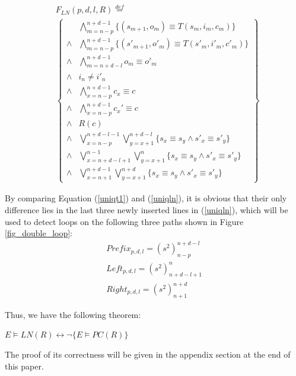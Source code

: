 \documentclass[journal]{IEEEtran}
\begin{document}
\begin{equation}\label{uniqln}
\begin{split}
&F_{LN}(p,d,l,R)\stackrel{def}{=}\\
&\left\{
\begin{array}{cc}
&\bigwedge_{m=n-p}^{n+d-1}
\{
(s_{m+1},o_m)\equiv T(s_m,i_m,c_m)
\}
\\
\wedge&\bigwedge_{m=n-p}^{n+d-1}
\{
(s'_{m+1},o'_m)\equiv T(s'_m,i'_m,c'_m)
\}
\\
\wedge&\bigwedge_{m=n+d-l}^{n+d-1}o_m\equiv o'_m \\
\wedge& i_n\ne i'_n \\
\wedge&\bigwedge_{x=n-p}^{n+d-1}c_x\equiv c \\
\wedge&\bigwedge_{x=n-p}^{n+d-1}c_x'\equiv c \\
\wedge& R(c) \\
\wedge& \bigvee_{x=n-p}^{n+d-l-1}\bigvee_{y=x+1}^{n+d-l} \{s_x\equiv s_y\wedge s'_x\equiv s'_y\} \\
\wedge& \bigvee_{x=n+d-l+1}^{n-1}\bigvee_{y=x+1}^{n} \{s_x\equiv s_y\wedge s'_x\equiv s'_y\} \\
\wedge& \bigvee_{x=n+1}^{n+d-1}\bigvee_{y=x+1}^{n+d} \{s_x\equiv s_y\wedge s'_x\equiv s'_y\}
\end{array}
\right\}
\end{split}
\end{equation}

By comparing Equation (\ref{uniqt1}) and (\ref{uniqln}),
it is obvious that their only difference lies in the last three newly inserted lines in (\ref{uniqln}),
which will be used to detect loops on the following three paths shown in Figure \ref{fig_double_loop}:
\begin{equation}
\begin{array}{c}
Prefix_{p,d,l}=(s^2)_{n-p}^{n+d-l} \\
Left_{p,d,l}=(s^2)_{n+d-l+1}^n \\
Right_{p,d,l}=(s^2)_{n+1}^{n+d}
\end{array}
\end{equation}

Thus,
we have the following theorem:

\begin{theorem}\label{thm_pcln_exclusive}
$E\vDash LN(R)\leftrightarrow \neg \{E\vDash PC(R)\}$
\end{theorem}

The proof of its correctness will be given in the appendix section at the end of this paper.
\end{document}
